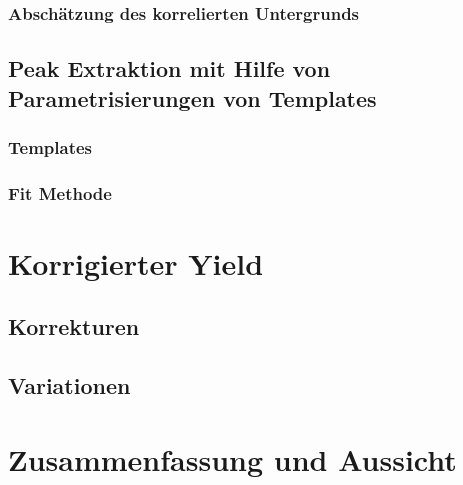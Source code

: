 \documentclass[11pt]{article}
\begin{document}
	\subsubsection{Absch{\"a}tzung des korrelierten Untergrunds}
	\subsection{Peak Extraktion mit Hilfe von Parametrisierungen von Templates}
	\subsubsection{Templates}
	\subsubsection{Fit Methode}
\section{Korrigierter Yield}
\subsection{Korrekturen}
\subsection{Variationen}
\section{Zusammenfassung und Aussicht}
\end{document}
